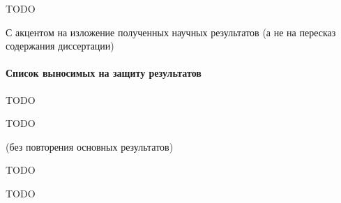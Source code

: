 
TODO

С акцентом на изложение полученных научных результатов
(а не на пересказ содержания диссертации)

\paragraph{Список выносимых на защиту результатов}

TODO


TODO

(без повторения основных результатов)


TODO


TODO
